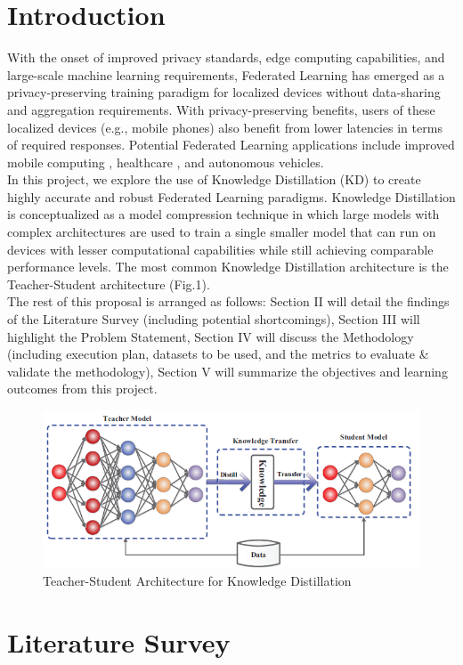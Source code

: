 \documentclass[conference]{IEEEtran}
\begin{document}
\section{Introduction}
With the onset of improved privacy standards, edge computing capabilities, and large-scale machine learning requirements, Federated Learning has emerged as a privacy-preserving training paradigm for localized devices without data-sharing and aggregation requirements. With privacy-preserving benefits, users of these localized devices (e.g., mobile phones) also benefit from lower latencies in terms of required responses. Potential Federated Learning applications include improved mobile computing \cite{b1}, healthcare \cite{b2}, and autonomous vehicles. \\
In this project, we explore the use of Knowledge Distillation (KD) to create highly accurate and robust Federated Learning paradigms. Knowledge Distillation is conceptualized as a model compression technique in which large models with complex architectures are used to train a single smaller model that can run on devices with lesser computational capabilities while still achieving comparable performance levels. The most common Knowledge Distillation architecture is the Teacher-Student architecture (Fig.1). \\
The rest of this proposal is arranged as follows: Section II will detail the findings of the Literature Survey (including potential shortcomings), Section III will highlight the Problem Statement, Section IV will discuss the Methodology (including execution plan, datasets to be used, and the metrics to evaluate \& validate the methodology), Section V will summarize the objectives and learning outcomes from this project.
\begin{figure}[htbp]
\centering
\includegraphics[scale=0.5]{Knowledge_Distillation.png}
\caption{Teacher-Student Architecture for Knowledge Distillation \cite{b3}}
\label{fig}
\end{figure}
\section{Literature Survey}
\end{document}
